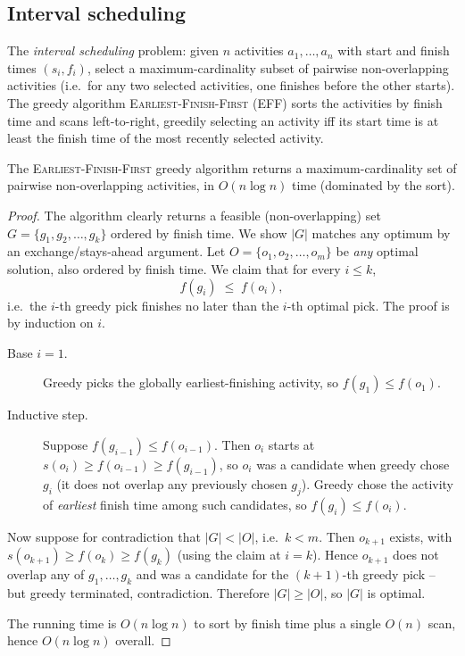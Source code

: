 \subsection{Interval scheduling}

\begin{example}[Setup]
\label{ex:interval_scheduling_setup}
The \emph{interval scheduling} problem: given $n$ activities $a_1, \dots, a_n$ with start and finish times $(s_i, f_i)$, select a maximum-cardinality subset of pairwise non-overlapping activities (i.e.\ for any two selected activities, one finishes before the other starts). The greedy algorithm \textsc{Earliest-Finish-First} (EFF) sorts the activities by finish time and scans left-to-right, greedily selecting an activity iff its start time is at least the finish time of the most recently selected activity.
\end{example}

\begin{theorem}
\label{thm:interval_scheduling}
The \textsc{Earliest-Finish-First} greedy algorithm returns a maximum-cardinality set of pairwise non-overlapping activities, in $O(n \log n)$ time (dominated by the sort).
\end{theorem}

\begin{proof}
The algorithm clearly returns a feasible (non-overlapping) set $G = \{g_1, g_2, \dots, g_k\}$ ordered by finish time. We show $|G|$ matches any optimum by an exchange/stays-ahead argument. Let $O = \{o_1, o_2, \dots, o_m\}$ be \emph{any} optimal solution, also ordered by finish time. We claim that for every $i \le k$,
\[
  f(g_i) \;\le\; f(o_i),
\]
i.e.\ the $i$-th greedy pick finishes no later than the $i$-th optimal pick. The proof is by induction on $i$.
\begin{description}
  \item[Base $i=1$.] Greedy picks the globally earliest-finishing activity, so $f(g_1) \le f(o_1)$.
  \item[Inductive step.] Suppose $f(g_{i-1}) \le f(o_{i-1})$. Then $o_i$ starts at $s(o_i) \ge f(o_{i-1}) \ge f(g_{i-1})$, so $o_i$ was a candidate when greedy chose $g_i$ (it does not overlap any previously chosen $g_j$). Greedy chose the activity of \emph{earliest} finish time among such candidates, so $f(g_i) \le f(o_i)$.
\end{description}
Now suppose for contradiction that $|G| < |O|$, i.e.\ $k < m$. Then $o_{k+1}$ exists, with $s(o_{k+1}) \ge f(o_k) \ge f(g_k)$ (using the claim at $i=k$). Hence $o_{k+1}$ does not overlap any of $g_1, \dots, g_k$ and was a candidate for the $(k+1)$-th greedy pick -- but greedy terminated, contradiction. Therefore $|G| \ge |O|$, so $|G|$ is optimal.

The running time is $O(n \log n)$ to sort by finish time plus a single $O(n)$ scan, hence $O(n \log n)$ overall.
\end{proof}

